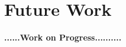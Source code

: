 \section{Future Work}
    
    
    
    

\textbf{......\textbf{Work on Progress}..........}       